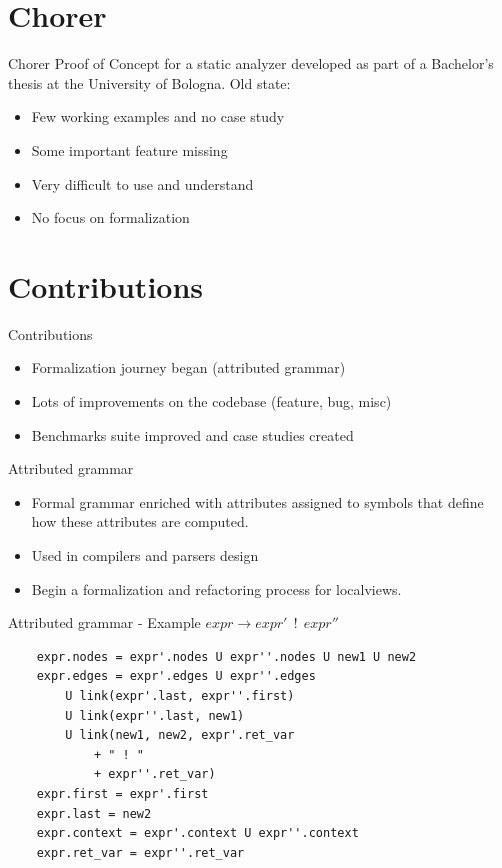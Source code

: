 \documentclass{beamer}
\begin{document}
\section{Chorer}
\begin{frame}{Chorer}
Proof of Concept for a static analyzer
developed as part of a Bachelor’s thesis at the University of Bologna.
Old state:
\bigskip
\begin{itemize}
    \item Few working examples and no case study
    \bigskip
    \item Some important feature missing
    \bigskip
    \item Very difficult to use and understand
    \bigskip
    \item No focus on formalization
\end{itemize}
\end{frame}

\section{Contributions}
\begin{frame}{Contributions}
\begin{itemize}
    \item Formalization journey began (attributed grammar)
    \bigskip
    \item Lots of improvements on the codebase (feature, bug, misc)
    \bigskip
    \item Benchmarks suite improved and case studies created 
\end{itemize}
\end{frame}

\begin{frame}{Attributed grammar}
\begin{itemize}
    \item Formal grammar enriched with attributes assigned to symbols 
    that define how these attributes are computed.
    \bigskip
    \item Used in compilers and parsers design
    \bigskip
    \item Begin a formalization and refactoring process for localviews. 
\end{itemize}
\end{frame}

\begin{frame}[fragile]{Attributed grammar - Example}
$expr \to expr'\ \ !\ \ expr''$
\begin{center}
    \begin{verbatim}
    expr.nodes = expr'.nodes U expr''.nodes U new1 U new2
    expr.edges = expr'.edges U expr''.edges
        U link(expr'.last, expr''.first)
        U link(expr''.last, new1)
        U link(new1, new2, expr'.ret_var 
            + " ! " 
            + expr''.ret_var)
    expr.first = expr'.first
    expr.last = new2
    expr.context = expr'.context U expr''.context
    expr.ret_var = expr''.ret_var
\end{verbatim}
\end{center}
\end{frame}
\end{document}
